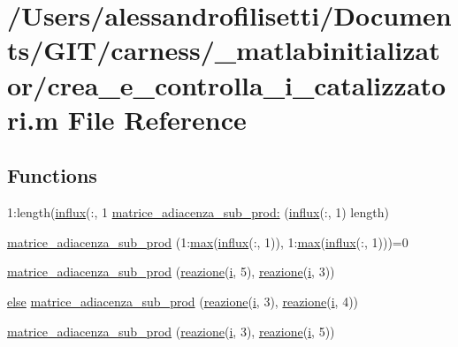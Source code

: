 \hypertarget{a00104}{\section{/\+Users/alessandrofilisetti/\+Documents/\+G\+I\+T/carness/\+\_\+matlabinitializator/crea\+\_\+e\+\_\+controlla\+\_\+i\+\_\+catalizzatori.m File Reference}
\label{a00104}
}
\subsection*{Functions}
\begin{DoxyCompactItemize}
\item 
1\+:length(\hyperlink{a00107_a902e747aeec6b345d3a057099152f41f}{influx}(\+:, 1 \hyperlink{a00104_ad3ba7e77abc2d4baf272dca9fdca1f63}{matrice\+\_\+adiacenza\+\_\+sub\+\_\+prod\+:} (\hyperlink{a00107_a902e747aeec6b345d3a057099152f41f}{influx}(\+:, 1) length)
\item 
\hyperlink{a00104_ae7da9fe2a41436b8435a4d7e5066d310}{matrice\+\_\+adiacenza\+\_\+sub\+\_\+prod} (1\+:\hyperlink{a00104_a6d9c24e62aee61f54530163edf684ae2}{max}(\hyperlink{a00107_a902e747aeec6b345d3a057099152f41f}{influx}(\+:, 1)), 1\+:\hyperlink{a00104_a6d9c24e62aee61f54530163edf684ae2}{max}(\hyperlink{a00107_a902e747aeec6b345d3a057099152f41f}{influx}(\+:, 1)))=0
\item 
\hyperlink{a00104_aae3caf6a86a43bdf9fe5a6588adce1b2}{matrice\+\_\+adiacenza\+\_\+sub\+\_\+prod} (\hyperlink{a00110_a65cf6e12ba9a8c10222f3f1f71f7c95f}{reazione}(\hyperlink{a00113_ad3efca1ea6e3333daf30719ee0501862}{i}, 5), \hyperlink{a00110_a65cf6e12ba9a8c10222f3f1f71f7c95f}{reazione}(\hyperlink{a00113_ad3efca1ea6e3333daf30719ee0501862}{i}, 3))
\item 
\hyperlink{a00031_af5946383720aa572eb93e1e63afc23c2}{else} \hyperlink{a00104_a5ea236a7441a51f71adef1c414145d3b}{matrice\+\_\+adiacenza\+\_\+sub\+\_\+prod} (\hyperlink{a00110_a65cf6e12ba9a8c10222f3f1f71f7c95f}{reazione}(\hyperlink{a00113_ad3efca1ea6e3333daf30719ee0501862}{i}, 3), \hyperlink{a00110_a65cf6e12ba9a8c10222f3f1f71f7c95f}{reazione}(\hyperlink{a00113_ad3efca1ea6e3333daf30719ee0501862}{i}, 4))
\item 
\hyperlink{a00104_a3568a7566d3871de5460f8fe96044c26}{matrice\+\_\+adiacenza\+\_\+sub\+\_\+prod} (\hyperlink{a00110_a65cf6e12ba9a8c10222f3f1f71f7c95f}{reazione}(\hyperlink{a00113_ad3efca1ea6e3333daf30719ee0501862}{i}, 3), \hyperlink{a00110_a65cf6e12ba9a8c10222f3f1f71f7c95f}{reazione}(\hyperlink{a00113_ad3efca1ea6e3333daf30719ee0501862}{i}, 5))

\end{DoxyCompactItemize}
